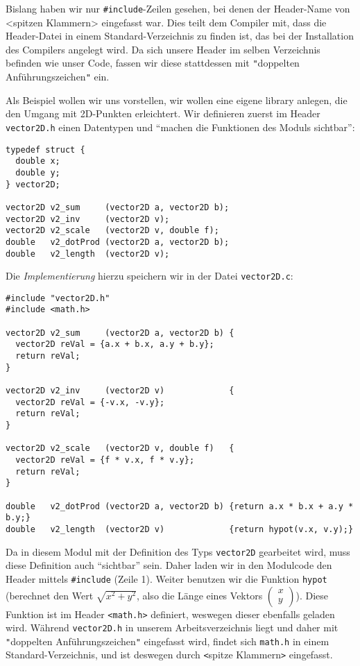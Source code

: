 Bislang haben wir nur \texttt{#include}-Zeilen gesehen, bei denen der Header-Name von <spitzen Klammern> eingefasst war. Dies teilt dem Compiler mit, dass die Header-Datei in einem Standard-Verzeichnis zu finden ist, das bei der Installation des Compilers angelegt wird. Da sich unsere Header \idR im selben Verzeichnis befinden wie unser Code, fassen wir diese stattdessen mit \texttt{"}doppelten Anführungszeichen\texttt{"} ein.

Als Beispiel wollen wir uns vorstellen, wir wollen eine eigene library anlegen, die den Umgang mit 2D-Punkten erleichtert. Wir definieren zuerst im Header \texttt{vector2D.h} einen Datentypen und \enquote{machen die Funktionen des Moduls sichtbar}:

\begin{codebox}
\begin{verbatim}
typedef struct {
  double x;
  double y;
} vector2D;

vector2D v2_sum     (vector2D a, vector2D b);
vector2D v2_inv     (vector2D v);
vector2D v2_scale   (vector2D v, double f);
double   v2_dotProd (vector2D a, vector2D b);
double   v2_length  (vector2D v);
\end{verbatim}
\end{codebox}

Die \emph{Implementierung} hierzu speichern wir in der Datei \texttt{vector2D.c}:

\begin{codebox}
\begin{verbatim}
#include "vector2D.h"
#include <math.h>

vector2D v2_sum     (vector2D a, vector2D b) {
  vector2D reVal = {a.x + b.x, a.y + b.y};
  return reVal;
}

vector2D v2_inv     (vector2D v)             {
  vector2D reVal = {-v.x, -v.y};
  return reVal;
}

vector2D v2_scale   (vector2D v, double f)   {
  vector2D reVal = {f * v.x, f * v.y};
  return reVal;
}

double   v2_dotProd (vector2D a, vector2D b) {return a.x * b.x + a.y * b.y;}
double   v2_length  (vector2D v)             {return hypot(v.x, v.y);}
\end{verbatim}
\end{codebox}

Da in diesem Modul mit der Definition des Typs \texttt{vector2D} gearbeitet wird, muss diese Definition auch \enquote{sichtbar} sein. Daher laden wir in den Modulcode den Header mittels \texttt{#include} (Zeile 1). Weiter benutzen wir die Funktion \texttt{hypot} (berechnet den Wert $\sqrt{x^{2} + y^{2}}$, also die Länge eines Vektors $\begin{pmatrix}
x \\ y
\end{pmatrix}$). Diese Funktion ist im Header \texttt{<math.h>} definiert, weswegen dieser ebenfalls geladen wird. Während \texttt{vector2D.h} in unserem Arbeitsverzeichnis liegt und daher mit \texttt{"}doppelten Anführungszeichen\texttt{"} eingefasst wird, findet sich \texttt{math.h} in einem Standard-Verzeichnis, und ist deswegen durch \texttt{<}spitze Klammern\texttt{>} eingefasst.

